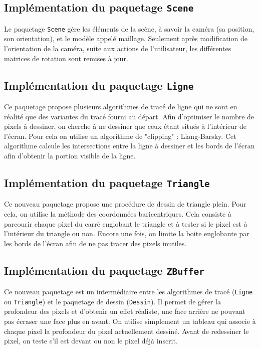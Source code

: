 \documentclass[10pt]{article}
\begin{document}
\subsection{Implémentation du paquetage {\tt Scene}}
Le paquetage {\tt Scene} gère les éléments de la scène, à savoir la caméra (sa position, son orientation), et le modèle appelé maillage.
Seulement après modification de l'orientation de la caméra, suite aux actions de l'utilisateur, les différentes matrices de rotation sont remises à jour.

\subsection{Implémentation du paquetage {\tt Ligne}}
Ce paquetage propose plusieurs algorithmes de tracé de ligne qui ne sont en réalité que des variantes du tracé fourni au départ.
Afin d'optimiser le nombre de pixels à dessiner, on cherche à ne dessiner que ceux étant situés à l'intérieur de l'écran.
Pour cela on utilise un algorithme de "clipping" : Liang-Barsky. Cet algorithme calcule les intersections entre la ligne à dessiner et les bords de l'écran afin d'obtenir la portion visible de la ligne.

\subsection{Implémentation du paquetage {\tt Triangle}}
Ce nouveau paquetage propose une procédure de dessin de triangle plein. Pour cela, on utilise la méthode des coordonnées baricentriques.
Cela consiste à parcourir chaque pixel du carré englobant le triangle et à tester si le pixel est à l'intérieur du triangle ou non.
Encore une fois, on limite la boite englobante par les bords de l'écran afin de ne pas tracer des pixels inutiles.

\subsection{Implémentation du paquetage {\tt ZBuffer}}
Ce nouveau paquetage est un intermédiaire entre les algorithmes de tracé ({\tt Ligne} ou {\tt Triangle})
et le paquetage de dessin ({\tt Dessin}). Il permet de gérer la profondeur des pixels et d'obtenir un effet réaliste, une face arrière ne pouvant pas écraser une face plus en avant.
On utilise simplement un tableau qui associe à chaque pixel la profondeur du pixel actuellement dessiné. Avant de redessiner le pixel, on teste s'il est devant ou non le pixel déjà inscrit.
\end{document}
